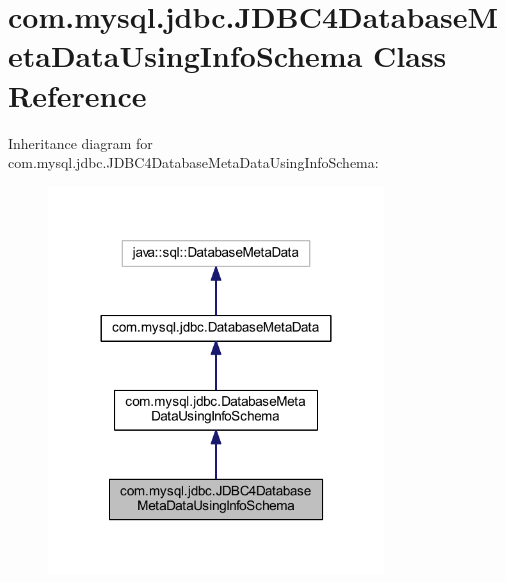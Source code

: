 \hypertarget{classcom_1_1mysql_1_1jdbc_1_1_j_d_b_c4_database_meta_data_using_info_schema}{}\section{com.\+mysql.\+jdbc.\+J\+D\+B\+C4\+Database\+Meta\+Data\+Using\+Info\+Schema Class Reference}
\label{classcom_1_1mysql_1_1jdbc_1_1_j_d_b_c4_database_meta_data_using_info_schema}


Inheritance diagram for com.\+mysql.\+jdbc.\+J\+D\+B\+C4\+Database\+Meta\+Data\+Using\+Info\+Schema\+:
\nopagebreak
\begin{figure}[H]
\begin{center}
\leavevmode
\includegraphics[width=252pt]{classcom_1_1mysql_1_1jdbc_1_1_j_d_b_c4_database_meta_data_using_info_schema__inherit__graph}
\end{center}
\end{figure}


